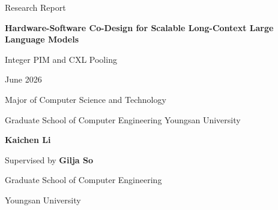 \documentclass[11pt,a4paper,oneside]{book}
\begin{document}

\begin{titlepage}
\thispagestyle{empty}
\begingroup
\coverfont
\singlespacing
\setlength{\parindent}{0pt}
\begin{center}
    \vspace*{9mm}

    {\fontsize{13}{16}\selectfont Research Report\par}

    \vspace{16mm}

    {\fontsize{22}{28}\selectfont
    \begin{minipage}{0.90\textwidth}
        \centering\coverfont\bfseries
        Hardware-Software Co-Design for Scalable Long-Context Large Language Models
    \end{minipage}\par}

    \vspace{7mm}

    {\fontsize{16}{20}\selectfont Integer PIM and CXL Pooling\par}

    \vspace{21mm}

    {\fontsize{13}{16}\selectfont June 2026\par}

    \vspace{15mm}

    {\fontsize{13}{16}\selectfont Major of Computer Science and Technology\par}
    \vspace{3mm}
    {\fontsize{13}{16}\selectfont Graduate School of Computer Engineering Youngsan University\par}

    \vspace{16mm}

    {\fontsize{13}{16}\selectfont \textbf{Kaichen Li}\par}

    \vspace{30mm}

    {\fontsize{13}{16}\selectfont Supervised by \textbf{Gilja So}\par}

    \vspace{27mm}

    {\fontsize{13}{16}\selectfont Graduate School of Computer Engineering\par}
    \vspace{4mm}
    {\fontsize{13}{16}\selectfont Youngsan University\par}
\end{center}
\endgroup
\end{titlepage}
\end{document}
